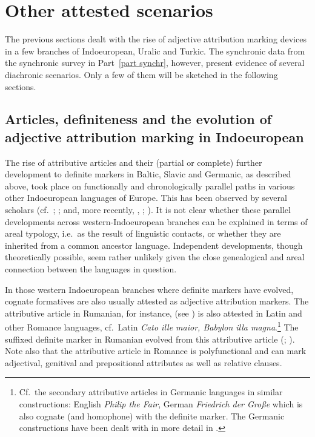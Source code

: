 {\section{Other attested scenarios}
The previous sections dealt with the rise of adjective attribution marking devices in a few branches of Indoeuropean, Uralic and Turkic. The synchronic data from the synchronic survey in Part~\ref{part synchr}, however, present evidence of several diachronic scenarios. Only a few of them will be sketched in the following sections.

\subsection[Articles, definiteness and adjective attribution]{Articles, definiteness and the evolution of adjective attribution marking in Indoeuropean}
The rise of attributive articles and their (partial or complete) further development to definite markers in Baltic, Slavic and Germanic, as described above, took place  on functionally and chronologically parallel paths in various other Indoeuropean languages of Europe. This has been observed by several scholars (cf.~\citealt{brugmann-etal1916}; \citealt{gamillscheg1937}; \citealt{heinrichs1954} and, more recently, \citealt{nocentini1996}, \citealt{philippi1997}; \citealt{himmelmann1997}). It is not clear whether these parallel developments across western-Indoeuropean branches can be explained in terms of areal typology, i.e.~as the result of linguistic contacts, or whether they are inherited from a common ancestor language. Independent developments, though theoretically possible, seem rather unlikely given the close genealogical and areal connection between the languages in question.

In those western Indoeuropean branches where definite markers have evolved, cognate formatives are also usually attested as adjective attribution markers. The attributive article in Rumanian, for instance, (see ) is also attested in Latin and other Romance languages, cf.~Latin \textit{Cato ille maior, Babylon illa magna}.\footnote{Cf.~the secondary attributive articles in Germanic languages in similar constructions: English \textit{Philip the Fair}, German \textit{Friedrich der Große} which is also cognate (and homophone) with the definite marker. The Germanic constructions have been dealt with in more detail in .} The suffixed definite marker in Rumanian evolved from this attributive article (\citealt{gamillscheg1937}; \citealt[5]{nocentini1996}). Note also that the attributive article in Romance is polyfunctional and can mark adjectival, genitival and prepositional attributes as well as relative clauses.

}
